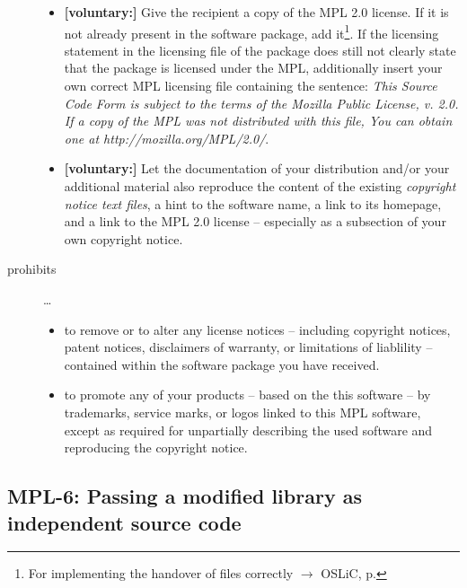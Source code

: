 \begin{description}
\begin{itemize}
  \item \textbf{[voluntary:]} Give the recipient a copy of the MPL 2.0 license.
  If it is not already present in the software package, add it\footnote{For
  implementing the handover of files correctly $\rightarrow$ OSLiC, p.
  \pageref{DistributingFilesHint}}. If the licensing statement in the licensing
  file of the package does still not clearly state that the package is licensed
  under the MPL, additionally insert your own correct MPL licensing file
  containing the sentence: \emph{This Source Code Form is subject to the terms
  of the Mozilla Public License, v. 2.0. If a copy of the MPL was not
  distributed with this file, You can obtain one at
  http://mozilla.org/MPL/2.0/}.
 
  \item \textbf{[voluntary:]} Let the documentation of your distribution and/or
  your additional material  also reproduce the content of the existing
  \emph{copyright notice text files}, a hint to the software name, a link to its
  homepage, and a link to the MPL 2.0 license -- especially as a subsection of
  your own copyright notice.

\end{itemize}  

\item[prohibits] \ldots
\begin{itemize}
  \item to remove or to alter any license notices -- including copyright
  notices, patent notices, disclaimers of warranty, or limitations of liablility
  -- contained within the software package you have received.
  \item to promote any of your products -- based on the this software -- by
  trademarks, service marks, or logos linked to this MPL software, except as
  required for unpartially describing the used software and reproducing the
  copyright notice.
\end{itemize}

\end{description}

\subsection{MPL-6: Passing a modified library as independent source code}
\label{OSUC-08-MPL}

